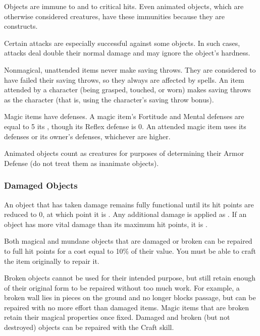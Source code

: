              Objects are immune to  and to critical hits. Even animated objects, which are otherwise considered creatures, have these immunities because they are constructs.

             Certain attacks are especially successful against some objects. In such cases, attacks deal double their normal damage and may ignore the object's hardness.

             Nonmagical, unattended items never make saving throws. They are considered to have failed their saving throws, so they always are affected by spells. An item attended by a character (being grasped, touched, or worn) makes saving throws as the character (that is, using the character's saving throw bonus).

            \par Magic items have defenses. A magic item's Fortitude and Mental defenses are equal to 5 \add its , though its Reflex defense is 0. An attended magic item uses its defenses or its owner's defenses, whichever are higher.

             Animated objects count as creatures for purposes of determining their Armor Defense (do not treat them as inanimate objects).


        \subsubsection{Damaged Objects}
            An object that has taken damage remains fully functional until its hit points are reduced to 0, at which point it is .
            Any additional damage is applied as .
            If an object has more vital damage than its maximum hit points, it is .

            Both magical and mundane objects that are damaged or broken can be repaired to full hit points for a cost equal to 10\% of their value.
            You must be able to craft the item originally to repair it.

            \label{Broken Objects}
            Broken objects cannot be used for their intended purpose, but still retain enough of their original form to be repaired without too much work. For example, a broken wall lies in pieces on the ground and no longer blocks passage, but can be repaired with no more effort than damaged items. Magic items that are broken retain their magical properties once fixed. Damaged and broken (but not destroyed) objects can be repaired with the Craft skill.

